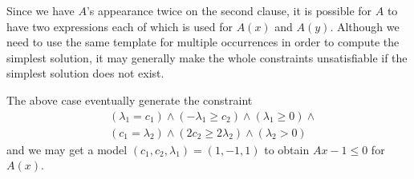 Since we have $A$'s appearance twice on the second clause, it is
possible for $A$ to have two expressions each of which is used for
$A(x)$ and $A(y)$.  Although we need to use the same template for
multiple occurrences in order to compute the simplest solution, it may
generally make the whole constraints unsatisfiable if the simplest
solution does not exist.

The above case eventually generate the constraint
\begin{align*}
& (\lambda_1 = c_1) \wedge (- \lambda_1 \geq c_2) \wedge (\lambda_1 \geq 0) \wedge \\
& (c_1 = \lambda_2) \wedge (2 c_2 \geq 2 \lambda_2) \wedge (\lambda_2 > 0)
\end{align*}
and we may get a model $(c_1, c_2, \lambda_1) = (1, -1, 1)$ to
obtain $Ax - 1 \leq 0$ for $A(x)$.

